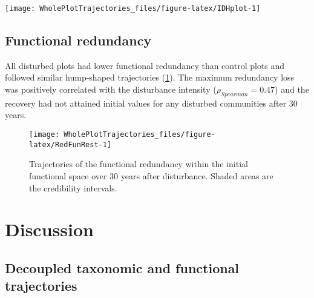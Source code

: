 \documentclass[fleqn,10pt]{ArtEcoFoG} %
\begin{document}
\begin{figure*}

{\centering \texttt{[image: WholePlotTrajectories\_files/figure-latex/IDHplot-1]} 

}

\caption{Relationship between the initial \%AGB loss and community taxonomic richness \textbf{(a)}, taxonomic evenness \textbf{(b)}, functional richness \textbf{(c)},and functional evenness \textbf{(d)} at 10, 20 and 30 years after disturbance}\label{fig:IDHplot}
\end{figure*}

\subsection{Functional redundancy}\label{functional-redundancy}

All disturbed plots had lower functional redundancy than control plots
and followed similar hump-shaped trajectories (\ref{fig:RedFunRest}).
The maximum redundancy loss was positively correlated with the
disturbance intensity (\(\rho_{Spearman}=0.47\)) and the recovery had
not attained initial values for any disturbed communities after 30
years.

\begin{figure}

{\centering \texttt{[image: WholePlotTrajectories\_files/figure-latex/RedFunRest-1]} 

}

\caption{Trajectories of the functional redundancy within the initial functional space over 30 years after disturbance. Shaded areas are the credibility intervals.}\label{fig:RedFunRest}
\end{figure}

\section{Discussion}\label{discussion}

\subsection{Decoupled taxonomic and functional
trajectories}\label{decoupled-taxonomic-and-functional-trajectories}
\end{document}
